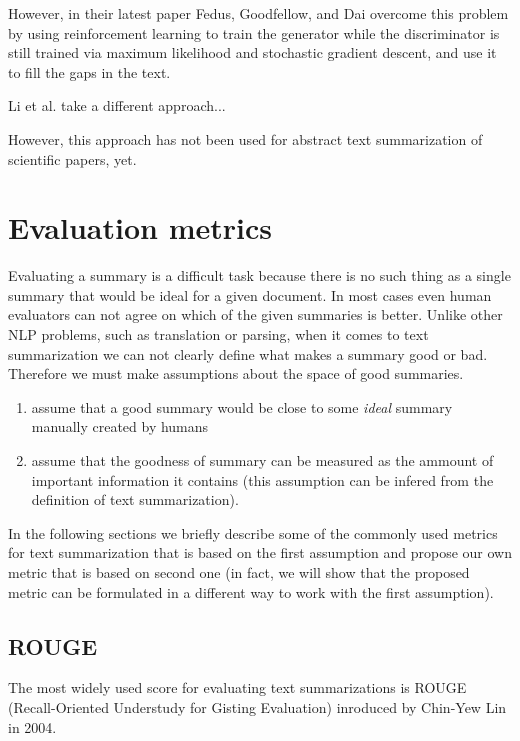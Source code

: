 \documentclass[sigplan]{acmart}
\begin{document}
However, in their latest paper Fedus, Goodfellow, and Dai\cite{fedus-18} overcome this problem by using reinforcement learning to train the generator while the discriminator is still trained via maximum likelihood and stochastic gradient descent, and use it to fill the gaps in the text.

Li et al.\cite{li-pan-18} take a different approach...
 
However, this approach has not been used for abstract text summarization of scientific papers, yet.

\section{Evaluation metrics}

Evaluating a summary is a difficult task because there is no such thing as a single summary that would be ideal for a given document. In most cases even human evaluators can not agree on which of the given summaries is better\cite{das-7}. Unlike other NLP problems, such as translation or parsing, when it comes to text summarization we can not clearly define what makes a summary good or bad. Therefore we must make assumptions about the space of good summaries. 

\begin{enumerate}
\item assume that a good summary would be close to some \textit{ideal} summary manually created by humans
\item assume that the goodness of summary can be measured as the ammount of important information it contains (this assumption can be infered from the definition of text summarization).
\end{enumerate}

In the following sections we briefly describe some of the commonly used metrics for text summarization that is based on the first assumption and propose our own metric that is based on second one (in fact, we will show that the proposed metric can be formulated in a different way to work with the first assumption).

\subsection{ROUGE}

The most widely used score for evaluating text summarizations is ROUGE (Recall-Oriented Understudy for Gisting Evaluation) inroduced by Chin-Yew Lin in 2004\cite{lin-4}\cite{kishore-2}.
\end{document}
